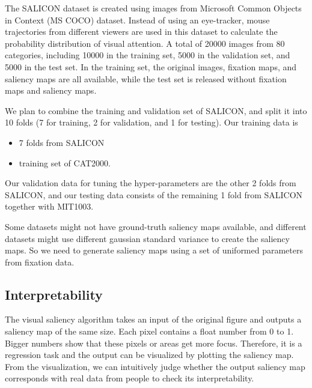 \documentclass[12pt]{article}
\begin{document}
The SALICON dataset is created using images from Microsoft Common Objects in Context (MS COCO) dataset\cite{linMicrosoftCOCOCommon2015}.
Instead of using an eye-tracker, mouse trajectories from different viewers are used in this dataset to calculate the probability distribution of visual attention. A total of 20000 images from 80 categories, including
10000 in the training set, 5000 in the validation set, and 5000 in the test set.
In the training set, the original images, fixation maps, and saliency maps are all available, while
the test set is released without fixation maps and saliency maps.


We plan to combine the training and validation set of SALICON, 
and split it into 10 folds (7 for training, 2 for validation, and 1 for testing). 
Our training data is
\begin{itemize}
    \item 7 folds from SALICON
    \item training set of CAT2000.
\end{itemize}
Our validation data for tuning the hyper-parameters are the other 2 folds from SALICON, and our testing data consists of the remaining 1 fold from SALICON together with MIT1003.

Some datasets might not have ground-truth saliency maps available, and different datasets might use different gaussian standard variance to create the saliency maps.
So we need to generate saliency maps using a set of uniformed parameters from fixation data.

\subsection{Interpretability}

The visual saliency algorithm takes an input of the original figure and outputs a saliency map of the same size. Each pixel contains a float number from 0 to 1. Bigger numbers show that these pixels or areas get more focus. Therefore, it is a regression task and the output can be visualized by plotting the saliency map. From the visualization, we can intuitively judge whether the output saliency map corresponds with real data from people to check its interpretability.
\end{document}
